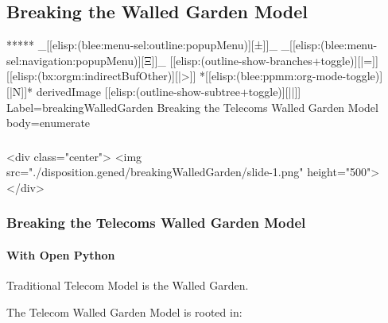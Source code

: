 \begin{whenOrg}
\section{Breaking the Walled Garden Model}

\begin{whenOrg}
*****  _[[elisp:(blee:menu-sel:outline:popupMenu)][±]]_ _[[elisp:(blee:menu-sel:navigation:popupMenu)][Ξ]]_ [[elisp:(outline-show-branches+toggle)][|=]] [[elisp:(bx:orgm:indirectBufOther)][|>]] *[[elisp:(blee:ppmm:org-mode-toggle)][|N]]*  derivedImage [[elisp:(outline-show-subtree+toggle)][||]] Label=breakingWalledGarden Breaking the Telecoms Walled Garden Model body=enumerate
\end{whenOrg}

\begin{htmlonly}

\begin{frame}[fragile,plain,label=breakingWalledGarden]
    \frametitle{}
    \framesubtitle{}
    \begin{rawhtml}
<div class="center">
<img src="./disposition.gened/breakingWalledGarden/slide-1.png" height="500">
</div>
    \end{rawhtml}
\end{frame}
\end{htmlonly}

\begin{verblatex}

\begin{frame}[fragile,plain,label=breakingWalledGarden]
    \frametitle{Breaking the Telecoms Walled Garden Model}
    \framesubtitle{With Open Python}

Traditional Telecom Model is the Walled Garden.

The Telecom Walled Garden Model is rooted in:

\bigskip

\begin{small}
\begin{columns}[T]


\end{columns}
\end{small}
\end{frame}
\end{verblatex}
\end{whenOrg}
